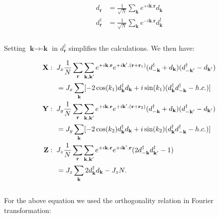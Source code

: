 \documentclass{article}
\begin{document}
\begin{equation}\label{eq:13}
	\begin{aligned}
		d_{\textbf{r}} &= \frac{1}{\sqrt{N}}\sum_\textbf{k} e^{+i\textbf{k}.\textbf{r}}d_{\textbf{k}} \\
		d^\dagger_{\textbf{r}} &= \frac{1}{\sqrt{N}}\sum_\textbf{k} e^{-i\textbf{k}.\textbf{r}}d^\dagger_{\textbf{k}} \\
	\end{aligned}
\end{equation}\\

\noindent Setting $\textbf{k} \rightarrow \textbf{-k}$ in $d^\dagger_\textbf{r}$ simplifies the calculations. We then have:

\begin{equation}\label{eq:14}
	\begin{aligned}
		\textbf{X}: \hspace{2mm} &J_x\frac{1}{N}\sum_\textbf{r}\sum_{\textbf{k},\textbf{k}'}e^{+i\textbf{k}.\textbf{r}}e^{+i\textbf{k}'.(\textbf{r}+\textbf{r}_1)}(d^\dagger_{-\textbf{k}} + d_{\textbf{k}})(d^\dagger_{-\textbf{k}'} - d_{\textbf{k}'})\\
		&= J_x\sum_{\textbf{k}} [-2\cos(k_1)d^\dagger_{\textbf{k}}d_{\textbf{k}} + i\sin(k_1)(d^\dagger_{\textbf{k}}d^\dagger_{-\textbf{k}}-h.c.)]\\
		\textbf{Y}: \hspace{2mm} &J_y\frac{1}{N}\sum_\textbf{r}\sum_{\textbf{k},\textbf{k}'}e^{+i\textbf{k}.\textbf{r}}e^{+i\textbf{k}'.(\textbf{r}+\textbf{r}_2)}(d^\dagger_{-\textbf{k}} + d_{\textbf{k}})(d^\dagger_{-\textbf{k}'} - d_{\textbf{k}'})\\
		&= J_y\sum_{\textbf{k}} [-2\cos(k_2)d^\dagger_{\textbf{k}}d_{\textbf{k}} + i\sin(k_2)(d^\dagger_{\textbf{k}}d^\dagger_{-\textbf{k}}-h.c.)]\\
		\textbf{Z}: \hspace{2mm} &J_z\frac{1}{N}\sum_\textbf{r}\sum_{\textbf{k},\textbf{k}'}e^{+i\textbf{k}.\textbf{r}}e^{+i\textbf{k}'.\textbf{r}}(2d^\dagger_{-\textbf{k}}d^\dagger_{\textbf{k}'}-1)\\
		&= J_z\sum_{\textbf{k}} 2d^\dagger_{\textbf{k}}d_{\textbf{k}}-J_zN.\\
	\end{aligned}
\end{equation}\\

\noindent For the above equation we used the orthogonality relation in Fourier transformation:
\end{document}
